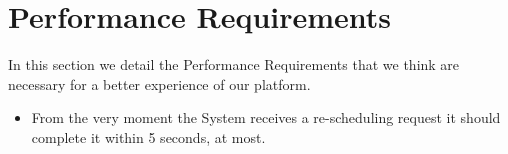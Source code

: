 \section{Performance Requirements}
In this section we detail the Performance Requirements that we think are necessary for a better experience of our platform.

\begin{itemize}
\item From the very moment the System receives a re-scheduling request it should complete it within 5 seconds, at most. 
\end{itemize}